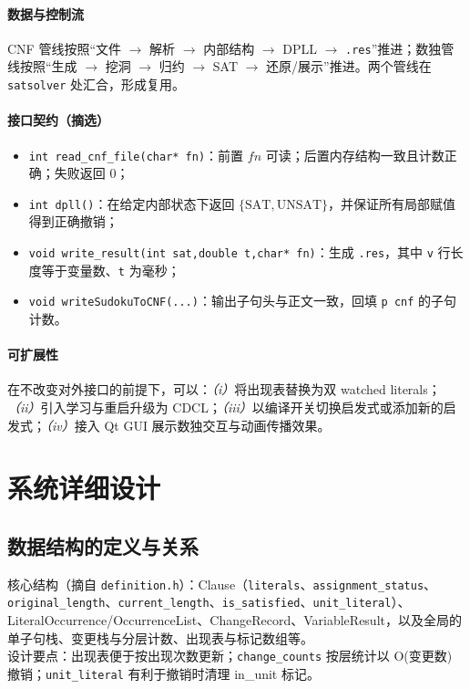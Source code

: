 \documentclass[UTF8]{ctexart}
\begin{document}
\paragraph{数据与控制流} CNF 管线按照“文件 \(\to\) 解析 \(\to\) 内部结构 \(\to\) DPLL \(\to\) \texttt{.res}”推进；数独管线按照“生成 \(\to\) 挖洞 \(\to\) 归约 \(\to\) SAT \(\to\) 还原/展示”推进。两个管线在 \texttt{satsolver} 处汇合，形成复用。

\paragraph{接口契约（摘选）} 
\begin{itemize}
  \item \texttt{int read\_cnf\_file(char* fn)}：前置 \(fn\) 可读；后置内存结构一致且计数正确；失败返回 0；
  \item \texttt{int dpll()}：在给定内部状态下返回 \(\{\text{SAT},\text{UNSAT}\}\)，并保证所有局部赋值得到正确撤销；
  \item \texttt{void write\_result(int sat,double t,char* fn)}：生成 \texttt{.res}，其中 \texttt{v} 行长度等于变量数、\texttt{t} 为毫秒；
  \item \texttt{void writeSudokuToCNF(...)}：输出子句头与正文一致，回填 \texttt{p cnf} 的子句计数。
\end{itemize}

\paragraph{可扩展性} 在不改变对外接口的前提下，可以：\emph{（i）}将出现表替换为双 watched literals；\emph{（ii）}引入学习与重启升级为 CDCL；\emph{（iii）}以编译开关切换启发式或添加新的启发式；\emph{（iv）}接入 Qt GUI 展示数独交互与动画传播效果。

\section{系统详细设计}
\subsection{数据结构的定义与关系}
核心结构（摘自 \texttt{definition.h}）：Clause（\texttt{literals}、\texttt{assignment\_status}、\texttt{original\_length}、\texttt{current\_length}、\texttt{is\_satisfied}、\texttt{unit\_literal}）、LiteralOccurrence/OccurrenceList、ChangeRecord、VariableResult，以及全局的单子句栈、变更栈与分层计数、出现表与标记数组等。\\
设计要点：出现表便于按出现次数更新；\texttt{change\_counts} 按层统计以 O(变更数) 撤销；\texttt{unit\_literal} 有利于撤销时清理 in\_unit 标记。
\end{document}
